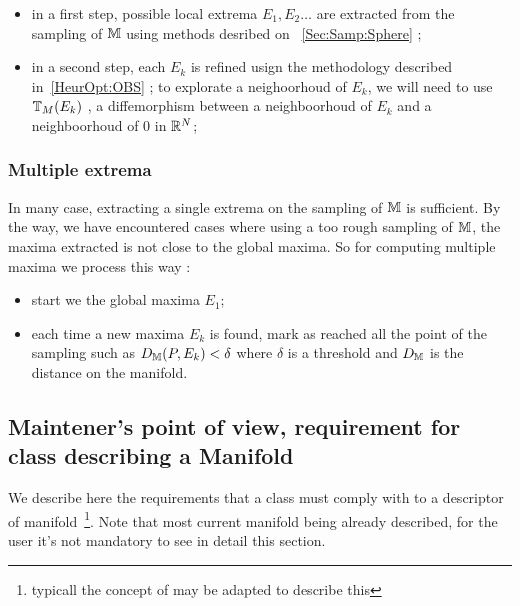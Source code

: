 \begin{itemize}
   \item  in a first step,  possible local extrema ${E_1,E_2 \dots}$ are extracted from the 
          sampling of $\mathbb{M}$ using methods desribed on ~\ref{Sec:Samp:Sphere} ;

   \item  in a second step,  each $E_k$ is refined usign the methodology described in~\ref{HeurOpt:OBS} ;
          to explorate a neighoorhoud of $E_k$,  we will need to use  $\mathbb{T}_M(E_k)$ ,
          a diffemorphism between a neighboorhoud of $E_k$ and a neighboorhoud of $0$ in $\mathbb{R}^N$;
\end{itemize}

\subsubsection{Multiple extrema}
\label{HeurOpt:Man:MulrExtr}

In many case, extracting a single extrema on the sampling of $\mathbb{M}$ is sufficient. By the way,
we have encountered cases where using a too rough sampling of $\mathbb{M}$, the maxima extracted is
not close to the global maxima. So for computing multiple maxima we process this way :

\begin{itemize}
   \item start we the global maxima $E_1$;
    \item each time a new maxima $E_k$ is found, mark as reached all the point of the sampling
          such as $D_{\mathbb{M}}(P,E_k) < \delta$  where $\delta$ is a threshold and $D_{\mathbb{M}}$ is
          the distance on the manifold.
\end{itemize}


\subsection{Maintener's point of view, requirement for class describing a Manifold}

\label{HeurOpt:ClassDescMan}

We describe here the requirements that a class must comply with to a descriptor of
manifold~\footnote{typicall the concept of  may be adapted to describe this}.
Note that most current manifold being already described, for the user it's not mandatory 
to see in detail this section.


